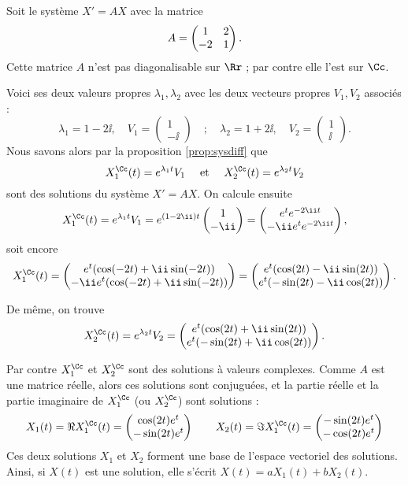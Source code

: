 \documentclass[12pt, class=report,crop=false]{standalone}
\begin{document}
\begin{exemple}
Soit le système $X'=AX$ avec la matrice
$$A = \begin{pmatrix}1&2\cr -2&1\end{pmatrix}.$$
Cette matrice $A$ n'est pas diagonalisable sur $\Rr$ ; par contre elle l'est sur $\Cc$.

Voici ses deux valeurs propres $\lambda_1,\lambda_2$ avec les deux vecteurs propres $V_1,V_2$ associés :
$$\lambda_1 = 1 - 2\ii, \quad V_1 = \begin{pmatrix} 1\\-\ii\end{pmatrix}
\quad;\quad
\lambda_2 = 1 + 2\ii, \quad V_2 = \begin{pmatrix} 1\\\ii\end{pmatrix}.$$
Nous savons alors par la proposition \ref{prop:sysdiff} que 
$$X_{1}^{\Cc}(t) = e^{\lambda_1 t} V_1 \quad \text{ et } \quad
X_{2}^{\Cc}(t) = e^{\lambda_2 t} V_2 $$
sont des solutions du système $X'=AX$.
On calcule ensuite
$$X_{1}^{\Cc}(t) 
= e^{\lambda_1 t} V_1
= e^{(1-2\ii)t} \begin{pmatrix} 1\\ -\ii\end{pmatrix}
= \begin{pmatrix} e^t e^{-2\ii t} \\ -\ii e^t e^{-2\ii t} \end{pmatrix},$$
soit encore
$$X_{1}^{\Cc}(t)
= \begin{pmatrix} e^t ( \cos(-2t)+ \ii \sin(-2t) ) \\ -\ii e^t( \cos(-2t)+ \ii \sin(-2t) )   \end{pmatrix}
= \begin{pmatrix} e^t ( \cos(2t) - \ii \sin(2t) ) \\  e^t( -\sin(2t)- \ii \cos(2t) )   \end{pmatrix}.$$

De même, on trouve 
$$X_{2}^{\Cc}(t) 
= e^{\lambda_2 t} V_2
= \begin{pmatrix} e^t ( \cos(2t) + \ii \sin(2t) ) \\  e^t( -\sin(2t) + \ii \cos(2t) ) \end{pmatrix}.$$


Par contre $X_1^{\Cc}$ et $X_2^{\Cc}$ sont des solutions à valeurs complexes.
Comme $A$ est une matrice réelle, alors ces solutions sont conjuguées, et la partie réelle et la partie imaginaire de $X_1^{\Cc}$ (ou $X_2^{\Cc}$) sont solutions :
$$X_1(t) = \Re X_1^{\Cc}(t) =
 \begin{pmatrix}  \cos(2t)e^t \\  -\sin(2t)e^t  \end{pmatrix}
 \qquad 
 X_2(t) = \Im X_1^{\Cc}(t) =
 \begin{pmatrix}  -\sin(2t)e^t \\ -\cos(2t)e^t \end{pmatrix}$$
Ces deux solutions $X_1$ et $X_2$ forment une base de l'espace vectoriel des solutions. Ainsi, si $X(t)$ est une solution, elle s'écrit
$X(t) = a X_1(t) + b X_2(t)$.


\end{exemple}
\end{document}
